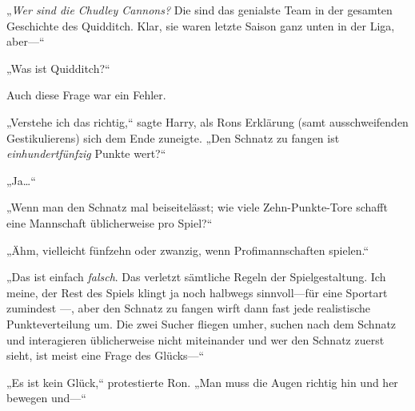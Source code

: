 „\emph{Wer sind die Chudley Cannons?} Die sind das genialste Team in der gesamten Geschichte des Quidditch. Klar, sie waren letzte Saison ganz unten in der Liga, aber—“

„Was ist Quidditch?“

Auch diese Frage war ein Fehler.

„Verstehe ich das richtig,“ sagte Harry, als Rons Erklärung (samt ausschweifenden Gestikulierens) sich dem Ende zuneigte. „Den Schnatz zu fangen ist \emph{einhundertfünfzig} Punkte wert?“

„Ja…“

„Wenn man den Schnatz mal beiseitelässt; wie viele Zehn-Punkte-Tore schafft eine Mannschaft üblicherweise pro Spiel?“

„Ähm, vielleicht fünfzehn oder zwanzig, wenn Profimannschaften spielen.“

„Das ist einfach \emph{falsch}. Das verletzt sämtliche Regeln der Spielgestaltung. Ich meine, der Rest des Spiels klingt ja noch halbwegs sinnvoll—für eine Sportart zumindest —, aber den Schnatz zu fangen wirft dann fast jede realistische Punkteverteilung um. Die zwei Sucher fliegen umher, suchen nach dem Schnatz und interagieren üblicherweise nicht miteinander und wer den Schnatz zuerst sieht, ist meist eine Frage des Glücks—“

„Es ist kein Glück,“ protestierte Ron. „Man muss die Augen richtig hin und her bewegen und—“

